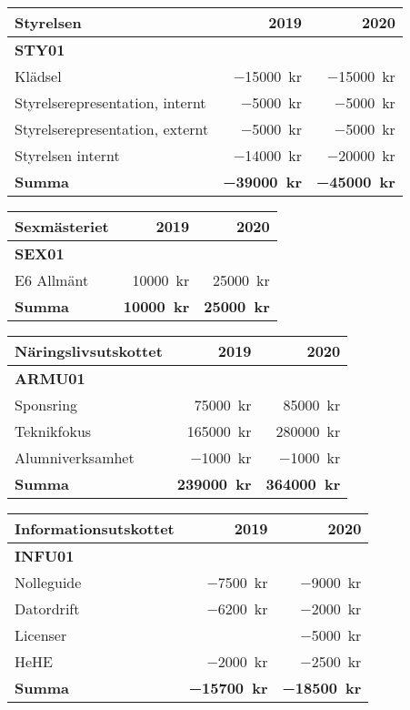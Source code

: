 \documentclass[../_main/handlingar.tex]{subfiles}
\begin{document}
\begin{tabularx}{10cm}{X r r}
    \textbf{\large Styrelsen} & \textbf{2019} & \textbf{2020} \\
    \hline
    \textbf{STY01} \\
    Klädsel & \SI{-15000}{kr} & \SI{-15000}{kr} \\
    Styrelserepresentation, internt & \SI{-5000}{kr} & \SI{-5000}{kr} \\
    Styrelserepresentation, externt & \SI{-5000}{kr} & \SI{-5000}{kr} \\
    Styrelsen internt & \SI{-14000}{kr} & \SI{-20000}{kr} \\
    \hline
    \textbf{Summa} & \textbf{\SI{-39000}{kr}} & \textbf{\SI{-45000}{kr}} \\
\end{tabularx}

\begin{tabularx}{10cm}{X r r}
    \textbf{\large Sexmästeriet} & \textbf{2019} & \textbf{2020} \\
    \hline
    \textbf{SEX01} \\
    E6 Allmänt & \SI{10000}{kr} & \SI{25000}{kr} \\
    \hline
    \textbf{Summa} & \textbf{\SI{10000}{kr}} & \textbf{\SI{25000}{kr}} \\
\end{tabularx}

\begin{tabularx}{10cm}{X r r}
    \textbf{\large Näringslivsutskottet} & \textbf{2019} & \textbf{2020} \\
    \hline
    \textbf{ARMU01} \\
    Sponsring & \SI{75000}{kr} & \SI{85000}{kr} \\
    Teknikfokus & \SI{165000}{kr} & \SI{280000}{kr} \\
    Alumniverksamhet & \SI{-1000}{kr} & \SI{-1000}{kr} \\
    \hline
    \textbf{Summa} & \textbf{\SI{239000}{kr}} & \textbf{\SI{364000}{kr}} \\
\end{tabularx}

\begin{tabularx}{10cm}{X r r}
    \textbf{\large Informationsutskottet} & \textbf{2019} & \textbf{2020} \\
    \hline
    \textbf{INFU01} \\
    Nolleguide & \SI{-7500}{kr} & \SI{-9000}{kr} \\
    Datordrift & \SI{-6200}{kr} & \SI{-2000}{kr} \\
    Licenser & & \SI{-5000}{kr} \\
    HeHE & \SI{-2000}{kr} & \SI{-2500}{kr} \\
    \hline
    \textbf{Summa} & \textbf{\SI{-15700}{kr}} & \textbf{\SI{-18500}{kr}} \\
\end{tabularx}
\end{document}
